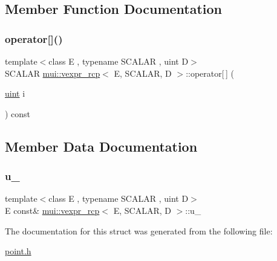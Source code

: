\subsection{Member Function Documentation}
\mbox{\label{structmui_1_1vexpr__rcp_aa4120e16dcbc4d2e9d563b77e77d78e5}} 
\subsubsection{\texorpdfstring{operator[]()}{operator[]()}}
{\footnotesize\ttfamily template$<$class E , typename S\+C\+A\+L\+AR , uint D$>$ \\
S\+C\+A\+L\+AR \hyperlink{structmui_1_1vexpr__rcp}{mui\+::vexpr\+\_\+rcp}$<$ E, S\+C\+A\+L\+AR, D $>$\+::operator\mbox{[}$\,$\mbox{]} (\begin{DoxyParamCaption}\item[{\hyperlink{namespacemui_af15a3e7188a2117fb9965277bb0cacd2}{uint}}]{i }\end{DoxyParamCaption}) const\hspace{0.3cm}{\ttfamily [inline]}}



\subsection{Member Data Documentation}
\mbox{\label{structmui_1_1vexpr__rcp_a58fc7290749c6c16ceef267d6d0d0fe9}} 
\subsubsection{\texorpdfstring{u\+\_\+}{u\_}}
{\footnotesize\ttfamily template$<$class E , typename S\+C\+A\+L\+AR , uint D$>$ \\
E const\& \hyperlink{structmui_1_1vexpr__rcp}{mui\+::vexpr\+\_\+rcp}$<$ E, S\+C\+A\+L\+AR, D $>$\+::u\+\_\+\hspace{0.3cm}{\ttfamily [protected]}}



The documentation for this struct was generated from the following file\+:\begin{DoxyCompactItemize}
\item 
\hyperlink{point_8h}{point.\+h}\end{DoxyCompactItemize}
